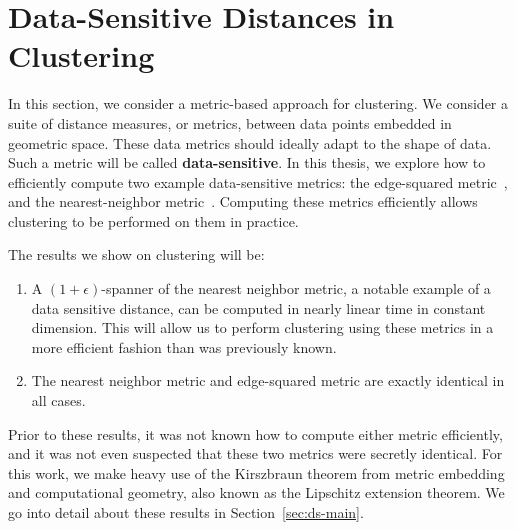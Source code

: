 \section{Data-Sensitive Distances in Clustering}\label{sec:ds}
%
 In this section, we consider a metric-based approach for clustering.  We consider a suite
  of distance measures, or metrics, between data points embedded in
  geometric space. These data metrics should ideally adapt to the shape
  of data. Such a metric will be called \textbf{data-sensitive}. In this thesis, we explore how to efficiently compute two
  example data-sensitive metrics: the edge-squared
  metric~\cite{vincent03}, and
  the nearest-neighbor metric~\cite{cohen15approximating}. Computing
  these metrics efficiently allows clustering to be performed on them in
  practice.

  The results we show on clustering will be:
  \begin{enumerate}
  \item A $(1+\epsilon)$-spanner of the nearest neighbor metric, a notable example of a data sensitive
  distance, can be computed in nearly linear time in constant dimension.
  This will allow us to perform clustering using these metrics in a more
  efficient fashion than was previously known.
  \item The nearest neighbor metric and edge-squared metric are exactly
  identical in all cases.
  \end{enumerate}
  Prior to these results, it was not known how to compute either metric
  efficiently, and it was not even suspected that these two metrics were
  secretly identical. For this work, we make heavy use of the Kirszbraun theorem from
  metric embedding and computational geometry, also known as the Lipschitz extension theorem. We go into detail about these results in
  Section~\ref{sec:ds-main}.


